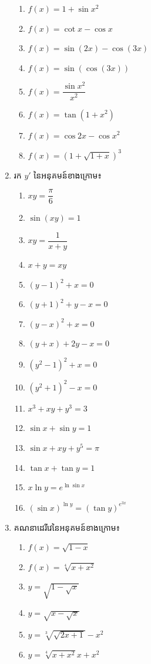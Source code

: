 \documentclass[12pt,fleqn]{book} %
\begin{document}
\begin{enumerate}
\begin{multicols}{2}
\begin{enumerate}
\item $f(x)=1+\sin x^2$
\item $f(x)=\cot x-\cos x$
\item $f(x)=\sin (2x)-\cos (3x)$
\item $f (x) = \sin (\cos (3x))$
\item $f(x)=\dfrac{\sin x^2}{ x^2}$
\item $f(x)=\tan (1+x^2)$
\item $ f(x)=\cos 2x-\cos x^2$
\item $f(x)= (1+\sqrt{1+x})^3$
\end{enumerate}
\end{multicols}
\item រក $y'$ នៃអនុគមន៍ខាងក្រោម៖
\begin{multicols}{2}
\begin{enumerate}
\item $xy = \dfrac{ \pi}{ 6}$
\item $ \sin (xy) = 1$
\item $xy =\dfrac{1}{x+y}$
\item $x+y=xy$
\item $(y-1)^2 +x=0$
\item $(y+1)^2 +y-x=0$
\item $(y-x)^2 +x=0$
\item $(y+x) +2y-x=0$
\item $ (y^2 -1)^2 +x=0$ 
\item $ (y^2 +1)^ 2 -x=0$
\item $x^3+xy+y^3=3$
\item $\sin x+\sin y=1$
\item $\sin x+xy+y^5 =\pi$
\item $\tan x+\tan y=1$
\item $x\ln y=e^{\ln \sin x}$
\item $(\sin x)^{\ln y}=(\tan y)^{e^{3x}}$
\end{enumerate}
\end{multicols}
\item គណនាដេរីវេនៃអនុគមន៍ខាងក្រោម៖
\begin{multicols}{2}
\begin{enumerate}
\item $f(x)= \sqrt{1-x}$
\item $f(x)= \sqrt[4]{ x+x^2}$
\item $y= \sqrt{1-\sqrt{x}}$
\item $y= \sqrt{x-\sqrt{ x}}$
\item $y=\sqrt[3]{\sqrt{ 2x+1}}-x^2$
\item $y= \sqrt[4]{x+x^2} x+x^2$

\end{enumerate}
\end{multicols}
\end{enumerate}
\end{document}
